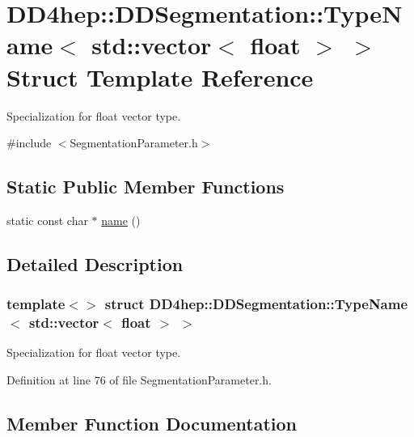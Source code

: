 \hypertarget{struct_d_d4hep_1_1_d_d_segmentation_1_1_type_name_3_01std_1_1vector_3_01float_01_4_01_4}{}\section{D\+D4hep\+:\+:D\+D\+Segmentation\+:\+:Type\+Name$<$ std\+:\+:vector$<$ float $>$ $>$ Struct Template Reference}
\label{struct_d_d4hep_1_1_d_d_segmentation_1_1_type_name_3_01std_1_1vector_3_01float_01_4_01_4}


Specialization for float vector type.  




{\ttfamily \#include $<$Segmentation\+Parameter.\+h$>$}

\subsection*{Static Public Member Functions}
\begin{DoxyCompactItemize}
\item 
static const char $\ast$ \hyperlink{struct_d_d4hep_1_1_d_d_segmentation_1_1_type_name_3_01std_1_1vector_3_01float_01_4_01_4_ab90b0133e8df2f36770110b233da7e42}{name} ()
\end{DoxyCompactItemize}


\subsection{Detailed Description}
\subsubsection*{template$<$$>$\newline
struct D\+D4hep\+::\+D\+D\+Segmentation\+::\+Type\+Name$<$ std\+::vector$<$ float $>$ $>$}

Specialization for float vector type. 

Definition at line 76 of file Segmentation\+Parameter.\+h.



\subsection{Member Function Documentation}
\hypertarget{struct_d_d4hep_1_1_d_d_segmentation_1_1_type_name_3_01std_1_1vector_3_01float_01_4_01_4_ab90b0133e8df2f36770110b233da7e42}{}\label{struct_d_d4hep_1_1_d_d_segmentation_1_1_type_name_3_01std_1_1vector_3_01float_01_4_01_4_ab90b0133e8df2f36770110b233da7e42} 
